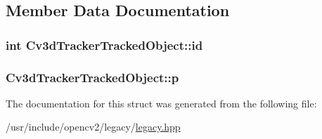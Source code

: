 \subsection{Member Data Documentation}
\hypertarget{structCv3dTrackerTrackedObject_ae9f2abd95cf68322777a0944201dccdc}{
\subsubsection[{id}]{\setlength{\rightskip}{0pt plus 5cm}int Cv3d\-Tracker\-Tracked\-Object\-::id}}\label{structCv3dTrackerTrackedObject_ae9f2abd95cf68322777a0944201dccdc}
\hypertarget{structCv3dTrackerTrackedObject_a406b9a7685966c258801d7b451a9f41e}{
\subsubsection[{p}]{ Cv3d\-Tracker\-Tracked\-Object\-::p}}\label{structCv3dTrackerTrackedObject_a406b9a7685966c258801d7b451a9f41e}


The documentation for this struct was generated from the following file\-:\begin{DoxyCompactItemize}
\item 
/usr/include/opencv2/legacy/\hyperlink{legacy_8hpp}{legacy.\-hpp}\end{DoxyCompactItemize}
